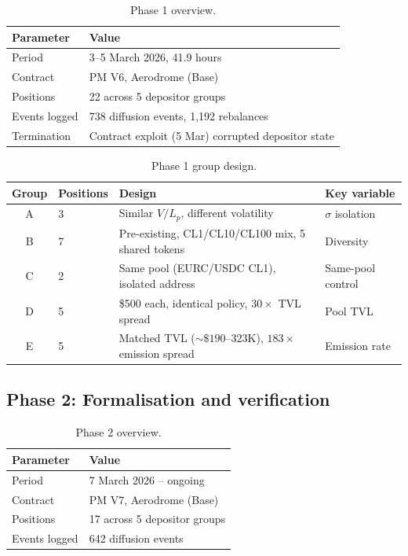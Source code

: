 \documentclass[11pt,a4paper]{article}
\begin{document}
\begin{table}[H]
\centering
\caption{Phase 1 overview.}\label{tab:phase1-overview}
\begin{tabular}{@{}ll@{}}
\toprule
Parameter & Value \\
\midrule
Period          & 3--5 March 2026, 41.9 hours \\
Contract        & PM V6, Aerodrome (Base) \\
Positions       & 22 across 5 depositor groups \\
Events logged   & 738 diffusion events, 1{,}192 rebalances \\
Termination     & Contract exploit (5 Mar) corrupted depositor state \\
\bottomrule
\end{tabular}
\end{table}

\begin{table}[H]
\centering
\caption{Phase 1 group design.}\label{tab:phase1-groups}
\begin{tabular}{@{}clL{8cm}l@{}}
\toprule
Group & Positions & Design & Key variable \\
\midrule
A & 3 & Similar $V/L_p$, different volatility & $\sigma$ isolation \\
B & 7 & Pre-existing, CL1/CL10/CL100 mix, 5 shared tokens & Diversity \\
C & 2 & Same pool (EURC/USDC CL1), isolated address & Same-pool control \\
D & 5 & \$500 each, identical policy, $30\times$ TVL spread & Pool TVL \\
E & 5 & Matched TVL (${\sim}\$190$--$323$K), $183\times$ emission spread & Emission rate \\
\bottomrule
\end{tabular}
\end{table}

\subsection{Phase 2: Formalisation and verification}\label{sec:phase2}

\begin{table}[H]
\centering
\caption{Phase 2 overview.}\label{tab:phase2-overview}
\begin{tabular}{@{}ll@{}}
\toprule
Parameter & Value \\
\midrule
Period          & 7 March 2026 -- ongoing \\
Contract        & PM V7, Aerodrome (Base) \\
Positions       & 17 across 5 depositor groups \\
Events logged   & 642 diffusion events \\
\bottomrule
\end{tabular}
\end{table}
\end{document}
